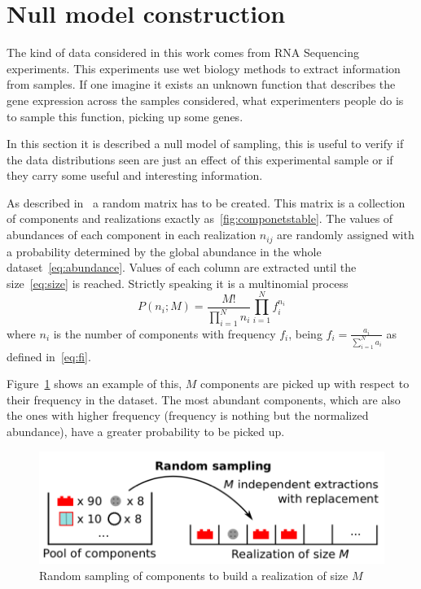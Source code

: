 \section{Null model construction}\label{sec:nullmodel}
The kind of data considered in this work comes from RNA Sequencing experiments. This experiments use wet biology methods to extract information from samples. If one imagine it exists an unknown function that describes the gene expression across the samples considered, what experimenters people do is to sample  this function, picking up some genes.

In this section it is described a null model of sampling, this is useful to verify if the data distributions seen are just an effect of this experimental sample or if they carry some useful and interesting information.

As described in~\cite{mazzolini2018heaps} a random matrix has to be created. This matrix is a collection of components and realizations exactly as~\ref{fig:componetstable}. The values of abundances of each component in each realization $n_{i j}$ are randomly assigned with a probability determined by 
the global abundance in the whole dataset~\ref{eq:abundance}. Values of each column are extracted until the size~\ref{eq:size} is 
reached. Strictly speaking it is a multinomial process
\begin{equation}
P\left({n_i};M\right)=\frac{M!}{\prod_{i=1}^{N} n_i}\prod_{i=1}^N f_i^{n_i}
\end{equation}
where $n_i$ is the number of components with frequency $f_i$, being $f_i=\frac{a_i}{\sum_{i=1}^{N}a_{i}}$ as defined in~\ref{eq:fi}.

Figure~\ref{fig:structure/randomsampling} shows an example of this, $M$ components are picked up with respect to their frequency in the dataset. The most abundant components, which are also the ones with higher frequency (frequency is nothing but the normalized abundance), have a greater probability to be picked up.
\begin{figure}
    \centering
    \includegraphics[width=0.8\linewidth]{pictures/structure/randomsampling.png}
    \caption{Random sampling of components to build a realization of size $M$}
    \label{fig:structure/randomsampling}
\end{figure}

